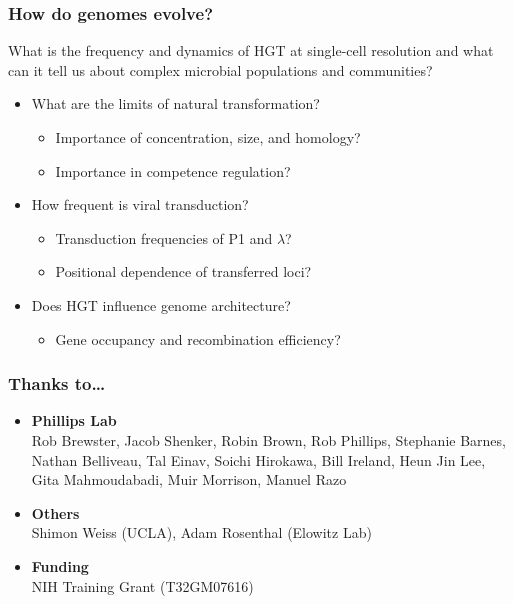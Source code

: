\begin{frame}
	\frametitle{How do genomes evolve?}
	\begin{center}\alert{What is the frequency and dynamics of HGT at single-cell resolution and what can
	it tell us about complex microbial populations and
communities?}\end{center}
\begin{itemize}
	\item What are the limits of natural transformation?
		\begin{itemize}
			\item Importance of concentration, size, and homology?
			\item Importance in competence regulation?
		\end{itemize}
	\item How frequent is viral transduction?
		\begin{itemize}
			\item Transduction frequencies of P1 and $\lambda$?
			\item Positional dependence of transferred loci?
		\end{itemize}
	\item Does HGT influence genome architecture?
		\begin{itemize}
			\item Gene occupancy and recombination efficiency?
		\end{itemize}
\end{itemize}

\end{frame}
\begin{frame}
	\frametitle{Thanks to\ldots}
\begin{itemize}
	\item \textbf{Phillips Lab} \\
			  \alert{Rob Brewster}, \alert{Jacob Shenker},
				\alert{Robin Brown}, \alert{Rob Phillips},
				Stephanie Barnes, Nathan Belliveau,
				Tal Einav, Soichi
				Hirokawa, Bill Ireland, Heun Jin Lee, Gita
				Mahmoudabadi, Muir Morrison, Manuel Razo 

	\item \textbf{Others}\\
	\indent	Shimon Weiss (UCLA), Adam Rosenthal (Elowitz Lab)
	\item \textbf{Funding}\\
		NIH Training Grant  (T32GM07616)
\end{itemize}
\end{frame}

